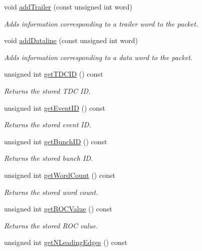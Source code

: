 \begin{DoxyCompactItemize}
void \hyperlink{class_packet_a13eccb2f6b6d527549839579920e5105}{add\+Trailer} (const unsigned int word)
\begin{DoxyCompactList}\small\item\em Adds information corresponding to a trailer word to the packet. \end{DoxyCompactList}\item 
void \hyperlink{class_packet_af3582cfb4893a3f61cb3e7b11e75787f}{add\+Dataline} (const unsigned int word)
\begin{DoxyCompactList}\small\item\em Adds information corresponding to a data word to the packet. \end{DoxyCompactList}\item 
unsigned int \hyperlink{class_packet_a4f4c3d99d89506a577073a2ce9e75e95}{get\+T\+D\+C\+ID} () const
\begin{DoxyCompactList}\small\item\em Returns the stored T\+DC ID. \end{DoxyCompactList}\item 
unsigned int \hyperlink{class_packet_a9a4d664eb908d788fc71bee88b905747}{get\+Event\+ID} () const
\begin{DoxyCompactList}\small\item\em Returns the stored event ID. \end{DoxyCompactList}\item 
unsigned int \hyperlink{class_packet_a3965d1b3a0e88e2af7cd1bd5ca97e009}{get\+Bunch\+ID} () const
\begin{DoxyCompactList}\small\item\em Returns the stored bunch ID. \end{DoxyCompactList}\item 
unsigned int \hyperlink{class_packet_aaa356da77eccb505207544c8034c1356}{get\+Word\+Count} () const
\begin{DoxyCompactList}\small\item\em Returns the stored word count. \end{DoxyCompactList}\item 
unsigned int \hyperlink{class_packet_a2a46912b82833c80b53e01114ef701a1}{get\+R\+O\+C\+Value} () const
\begin{DoxyCompactList}\small\item\em Returns the stored R\+OC value. \end{DoxyCompactList}\item 
unsigned int \hyperlink{class_packet_a461a138986888a01fb04205512a37410}{get\+N\+Leading\+Edges} () const

\end{DoxyCompactItemize}
